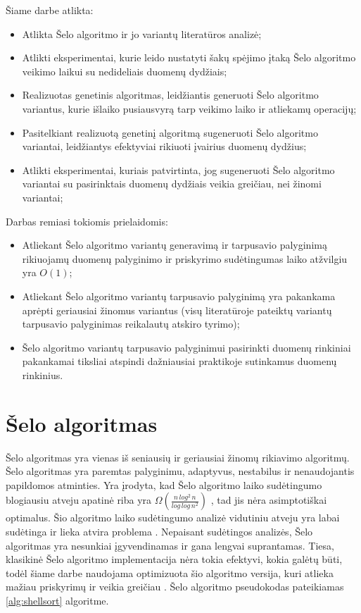 \documentclass{VUMIFInfBakalaurinis}
\begin{document}
\medskip

Šiame darbe atlikta:
\begin{itemize}
    \item Atlikta Šelo algoritmo ir jo variantų literatūros analizė;
    \item Atlikti eksperimentai, kurie leido nustatyti šakų spėjimo įtaką Šelo algoritmo veikimo laikui su nedideliais duomenų dydžiais;
    \item Realizuotas genetinis algoritmas, leidžiantis generuoti Šelo algoritmo variantus, kurie išlaiko pusiausvyrą tarp veikimo laiko ir atliekamų operacijų;
    \item Pasitelkiant realizuotą genetinį algoritmą sugeneruoti Šelo algoritmo variantai, leidžiantys efektyviai rikiuoti įvairius duomenų dydžius;
    \item Atlikti eksperimentai, kuriais patvirtinta, jog sugeneruoti Šelo algoritmo variantai su pasirinktais duomenų dydžiais veikia greičiau, nei žinomi variantai;
\end{itemize}

\medskip

Darbas remiasi tokiomis prielaidomis:
\begin{itemize}
    \item Atliekant Šelo algoritmo variantų generavimą ir tarpusavio palyginimą rikiuojamų duomenų palyginimo ir priskyrimo sudėtingumas laiko atžvilgiu yra $O(1)$;
    \item Atliekant Šelo algoritmo variantų tarpusavio palyginimą yra pakankama aprėpti geriausiai žinomus variantus
        (visų literatūroje pateiktų variantų tarpusavio palyginimas reikalautų atskiro tyrimo);
    \item Šelo algoritmo variantų tarpusavio palyginimui pasirinkti duomenų rinkiniai pakankamai tiksliai atspindi dažniausiai praktikoje sutinkamus duomenų rinkinius.
\end{itemize}


\section{Šelo algoritmas}

Šelo algoritmas yra vienas iš seniausių ir geriausiai žinomų rikiavimo algoritmų.
Šelo algoritmas yra paremtas palyginimu, adaptyvus, nestabilus ir nenaudojantis papildomos atminties.
Yra įrodyta, kad Šelo algoritmo laiko sudėtingumo blogiausiu atveju apatinė riba yra
$\Omega(\frac{n\,log^2\,n}{log\,log\,n^2})$ \cite{plaxton1992}, tad jis nėra asimptotiškai optimalus.
Šio algoritmo laiko sudėtingumo analizė vidutiniu atveju yra labai sudėtinga
ir lieka atvira problema \cite{ciura2001best,Radavičius_Baranauskas_2013}.
Nepaisant sudėtingos analizės, Šelo algoritmas yra nesunkiai įgyvendinamas ir gana lengvai suprantamas.
Tiesa, klasikinė Šelo algoritmo implementacija nėra tokia efektyvi, kokia galėtų būti, todėl šiame darbe naudojama
optimizuota šio algoritmo versija, kuri atlieka mažiau priskyrimų ir veikia greičiau \cite{Radavičius_Baranauskas_2013}.
Šelo algoritmo pseudokodas pateikiamas \ref{alg:shellsort} algoritme.
\end{document}
